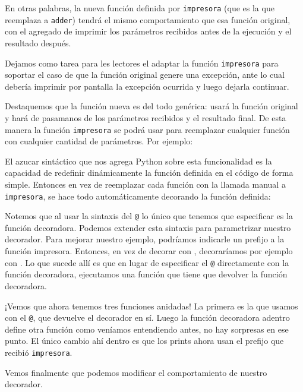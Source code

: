 En otras palabras, la nueva función definida por \texttt{impresora} (que es la que reemplaza a \texttt{adder}) tendrá el mismo comportamiento que esa función original, con el agregado de imprimir los parámetros recibidos antes de la ejecución y el resultado después.

Dejamos como tarea para les lectores el adaptar la función \texttt{impresora} para soportar el caso de que la función original genere una excepción, ante lo cual debería imprimir por pantalla la excepción ocurrida y luego dejarla continuar.

Destaquemos que la función nueva es del todo genérica: usará la función original y hará de pasamanos de los parámetros recibidos y el resultado final. De esta manera la función \texttt{impresora} se podrá usar para reemplazar cualquier función con cualquier cantidad de parámetros. Por ejemplo:


El azucar sintáctico que nos agrega Python sobre esta funcionalidad es la capacidad de redefinir dinámicamente la función definida en el código de forma simple. Entonces en vez de reemplazar cada función con la llamada manual a \texttt{impresora}, se hace todo automáticamente decorando la función definida:


Notemos que al usar la sintaxis del \texttt{@} lo único que tenemos que especificar es la función decoradora. Podemos extender esta sintaxis para parametrizar nuestro decorador. Para mejorar nuestro ejemplo, podríamos indicarle un prefijo a la función impresora. Entonces, en vez de decorar con , decoraríamos por ejemplo con . Lo que sucede allí es que en lugar de especificar el \texttt{@} directamente con la función decoradora, ejecutamos una función que tiene que devolver la función decoradora.


¡Vemos que ahora tenemos tres funciones anidadas! La primera es la que usamos con el \texttt{@}, que devuelve el decorador en sí. Luego la función decoradora adentro define otra función como veníamos entendiendo antes, no hay sorpresas en ese punto. El único cambio ahí dentro es que los prints ahora usan el prefijo que recibió \texttt{impresora}.


Vemos finalmente que podemos modificar el comportamiento de nuestro decorador.
